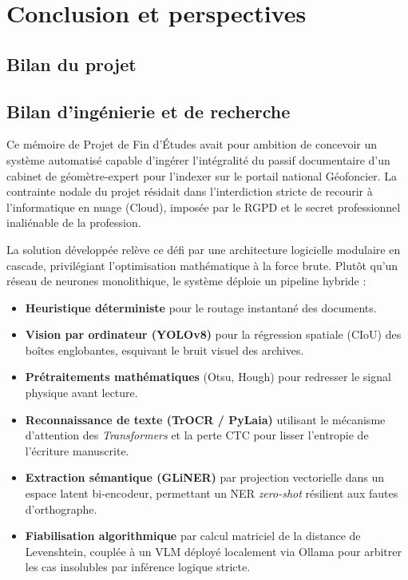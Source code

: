 
\section{Conclusion et perspectives}
\label{sec:conclusion}

\subsection{Bilan du projet}

\subsection{Bilan d'ingénierie et de recherche}

Ce mémoire de Projet de Fin d'Études avait pour ambition de concevoir un système automatisé capable d'ingérer l'intégralité du passif documentaire d'un cabinet de géomètre-expert pour l'indexer sur le portail national Géofoncier. La contrainte nodale du projet résidait dans l'interdiction stricte de recourir à l'informatique en nuage (Cloud), imposée par le RGPD et le secret professionnel inaliénable de la profession.

La solution développée relève ce défi par une architecture logicielle modulaire en cascade, privilégiant l'optimisation mathématique à la force brute. Plutôt qu'un réseau de neurones monolithique, le système déploie un pipeline hybride :
\begin{itemize}
  \item \textbf{Heuristique déterministe} pour le routage instantané des documents.
  \item \textbf{Vision par ordinateur (YOLOv8)} pour la régression spatiale (CIoU) des boîtes englobantes, esquivant le bruit visuel des archives.
  \item \textbf{Prétraitements mathématiques} (Otsu, Hough) pour redresser le signal physique avant lecture.
  \item \textbf{Reconnaissance de texte (TrOCR / PyLaia)} utilisant le mécanisme d'attention des \textit{Transformers} et la perte CTC pour lisser l'entropie de l'écriture manuscrite.
  \item \textbf{Extraction sémantique (GLiNER)} par projection vectorielle dans un espace latent bi-encodeur, permettant un NER \textit{zero-shot} résilient aux fautes d'orthographe.
  \item \textbf{Fiabilisation algorithmique} par calcul matriciel de la distance de Levenshtein, couplée à un VLM déployé localement via Ollama pour arbitrer les cas insolubles par inférence logique stricte.
\end{itemize}

